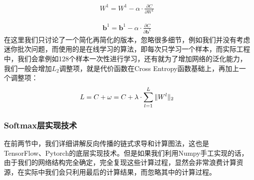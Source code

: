 \documentclass[UTF8]{article}
\begin{document}
\begin{equation}
\begin{aligned}
W^1=W^1 - \alpha \cdot \frac{\partial{C}}{\partial{W^1}}
\end{aligned}
\label{mlp-cg-backward-22}
\end{equation}

\begin{equation}
\begin{aligned}
\boldsymbol{b}^1=\boldsymbol{b}^1 - \alpha \cdot \frac{\partial{C}}{\partial{\boldsymbol{b}^1}}
\end{aligned}
\label{mlp-cg-backward-23}
\end{equation}
在这里我们只讨论了一个简化再简化的版本，忽略很多细节，例如我们并没有考虑迷你批次问题，而使用的是在线学习的算法，即每次只学习一个样本，而实际工程中，我们会拿例如128个样本一次性进行学习，还有就为了增加网络的泛化能力，我们一般会增加$L_2$调整项，就是代价函数在Cross Entropy函数基础上，再加上一个调整项：
\begin{equation}
\begin{aligned}
\boldmath{L}=C+\omega=C+ \lambda \cdot \sum_{l=1}^{L} \Vert W^l \Vert _2
\end{aligned}
\label{mlp-cg-backward-24}
\end{equation}

\subsubsection{Softmax层实现技术}
在前两节中，我们详细讲解反向传播的链式求导和计算图法，这也是TensorFlow、Pytorch的底层实现技术。但是如果我们利用Numpy手工实现的话，由于我们的网络结构完全确定，完全复现这些计算过程，显然会非常浪费计算资源，在实际中我们会只利用最后的计算结果，而忽略其中的计算过程。
\end{document}
